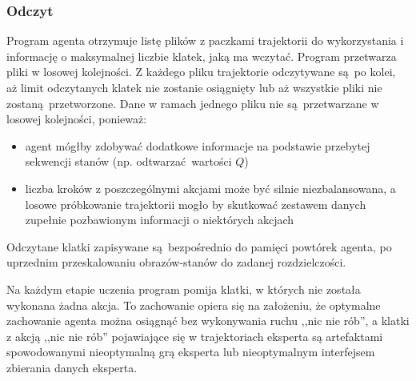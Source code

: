 \subsubsection{Odczyt}

Program agenta otrzymuje listę plików z paczkami trajektorii do wykorzystania i informację o maksymalnej liczbie klatek, jaką ma wczytać. Program przetwarza pliki w losowej kolejności. Z każdego pliku trajektorie odczytywane są po kolei, aż limit odczytanych klatek nie zostanie osiągnięty lub aż wszystkie pliki nie zostaną przetworzone.
Dane w ramach jednego pliku nie są przetwarzane w losowej kolejności, ponieważ:
\begin{itemize}
\item{agent mógłby zdobywać dodatkowe informacje na podstawie przebytej sekwencji stanów (np. odtwarzać wartości $Q$)}
\item{liczba kroków z poszczególnymi akcjami może być silnie niezbalansowana, a losowe próbkowanie trajektorii mogło by skutkować zestawem danych zupełnie pozbawionym informacji o niektórych akcjach}
\end{itemize}
Odczytane klatki zapisywane są bezpośrednio do pamięci powtórek agenta, po uprzednim przeskalowaniu obrazów-stanów do zadanej rozdzielczości.

Na każdym etapie uczenia program pomija klatki, w których nie została wykonana żadna akcja. To zachowanie opiera się na założeniu, że optymalne zachowanie agenta można osiągnąć bez wykonywania ruchu ,,nic nie rób'', a klatki z akcją ,,nic nie rób'' pojawiające się w trajektoriach eksperta są artefaktami spowodowanymi nieoptymalną grą eksperta lub nieoptymalnym interfejsem zbierania danych eksperta.
